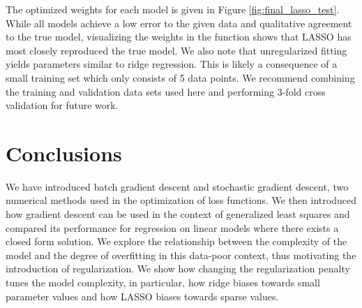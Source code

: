 \documentclass[10pt]{article}
\begin{document}
The optimized weights for each model is given in Figure \ref{fig:final_lasso_test}. While all models achieve a low error to the given data and qualitative agreement to the true model, visualizing the weights in the function shows that LASSO has most closely reproduced the true model. We also note that unregularized fitting yields parameters similar to ridge regression. This is likely a consequence of a small training set which only consists of 5 data points. We recommend combining the training and validation data sets used here and performing 3-fold cross validation for future work.


\section{Conclusions}

We have introduced batch gradient descent and stochastic gradient descent, two numerical methods used in the optimization of loss functions. We then introduced how gradient descent can be used in the context of generalized least squares and compared its performance for regression on linear models where there exists a closed form solution. We explore the relationship between the complexity of the model and the degree of overfitting in this data-poor context, thus motivating the introduction of regularization. We show how changing the regularization penalty tunes the model complexity, in particular, how ridge biases towards small parameter values and how LASSO biases towards sparse values.

 
\end{document}
